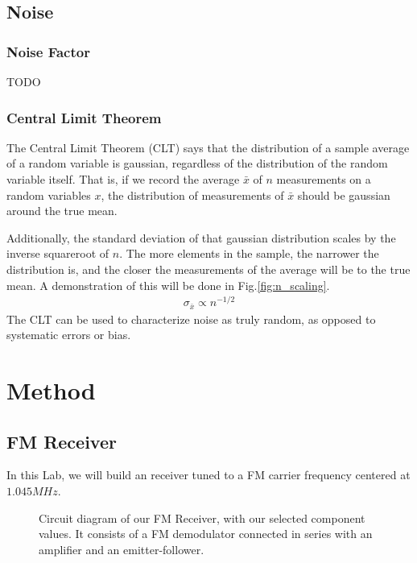 \documentclass[12pt]{article}
\begin{document}
\subsection*{Noise}
\subsubsection*{Noise Factor}
TODO
\subsubsection*{Central Limit Theorem}
The Central Limit Theorem (CLT) says that the distribution of a sample average of a random variable is gaussian, regardless of the distribution of the random variable itself. That is, if we record the average $\bar{x}$ of $n$ measurements on a random variables $x$, the distribution of measurements of $\bar{x}$ should be gaussian around the true mean.

Additionally, the standard deviation of that gaussian distribution scales by the inverse squareroot of $n$. The more elements in the sample, the narrower the distribution is, and the closer the measurements of the average will be to the true mean. A demonstration of this will be done in Fig.\ref{fig:n_scaling}.
\begin{eqnarray}
\sigma_{\bar{x}} \propto n^{-1/2} \label{eq:rootn}
\end{eqnarray}
The CLT can be used to characterize noise as truly random, as opposed to systematic errors or bias.
\section*{Method}

\subsection*{FM Receiver}
In this Lab, we will build an receiver tuned to a FM carrier frequency centered at $1.045MHz$.

\begin{figure}[H]
\caption{Circuit diagram of our FM Receiver, with our selected component values. It consists of a FM demodulator connected in series with an amplifier and an emitter-follower.}
\label{fig:circuitdiagram}
\end{figure}
\end{document}
